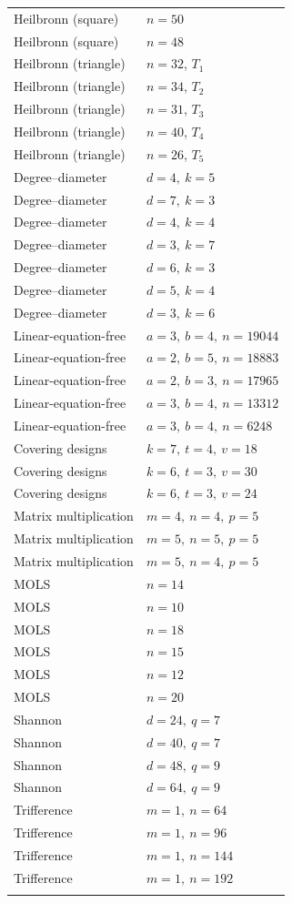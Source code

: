 \begin{longtable}{@{}P{.30\linewidth}P{.67\linewidth}@{}}
Heilbronn (square) & $n=50$ \\
Heilbronn (square) & $n=48$ \\
Heilbronn (triangle) & $n=32$, $T_{1}$ \\
Heilbronn (triangle) & $n=34$, $T_{2}$ \\
Heilbronn (triangle) & $n=31$, $T_{3}$ \\
Heilbronn (triangle) & $n=40$, $T_{4}$ \\
Heilbronn (triangle) & $n=26$, $T_{5}$ \\
\addlinespace[4pt]
Degree--diameter & $d=4,\ k=5$ \\
Degree--diameter & $d=7,\ k=3$ \\
Degree--diameter & $d=4,\ k=4$ \\
Degree--diameter & $d=3,\ k=7$ \\
Degree--diameter & $d=6,\ k=3$ \\
Degree--diameter & $d=5,\ k=4$ \\
Degree--diameter & $d=3,\ k=6$ \\
\addlinespace[4pt]
Linear-equation-free & $a=3,\ b=4,\ n=19044$ \\
Linear-equation-free & $a=2,\ b=5,\ n=18883$ \\
Linear-equation-free & $a=2,\ b=3,\ n=17965$ \\
Linear-equation-free & $a=3,\ b=4,\ n=13312$ \\
Linear-equation-free & $a=3,\ b=4,\ n=6248$ \\
\addlinespace[4pt]
Covering designs & $k=7,\ t=4,\ v=18$ \\
Covering designs & $k=6,\ t=3,\ v=30$ \\
Covering designs & $k=6,\ t=3,\ v=24$ \\
\addlinespace[4pt]
Matrix multiplication & $m=4,\ n=4,\ p=5$ \\
Matrix multiplication & $m=5,\ n=5,\ p=5$ \\
Matrix multiplication & $m=5,\ n=4,\ p=5$ \\
\addlinespace[4pt]
MOLS & $n=14$ \\
MOLS & $n=10$ \\
MOLS & $n=18$ \\
MOLS & $n=15$ \\
MOLS & $n=12$ \\
MOLS & $n=20$ \\
\addlinespace[4pt]
Shannon & $d=24,\ q=7$ \\
Shannon & $d=40,\ q=7$ \\
Shannon & $d=48,\ q=9$ \\
Shannon & $d=64,\ q=9$ \\
\addlinespace[4pt]
Trifference & $m=1,\ n=64$ \\
Trifference & $m=1,\ n=96$ \\
Trifference & $m=1,\ n=144$ \\
Trifference & $m=1,\ n=192$ \\
\addlinespace[4pt]
\end{longtable}
